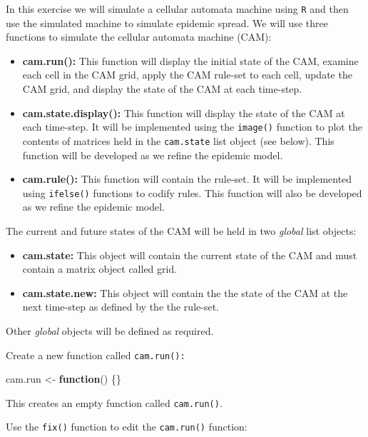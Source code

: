 \documentclass[12pt,a4paper]{book}
\newenvironment{Shaded}{\begin{snugshade}}{\end{snugshade}}
\newcommand{\ControlFlowTok}[1]{\textcolor[rgb]{0.13,0.29,0.53}{\textbf{#1}}}
\newcommand{\NormalTok}[1]{#1}
\newcommand{\StringTok}[1]{\textcolor[rgb]{0.31,0.60,0.02}{#1}}
\theoremstyle{definition}
\theoremstyle{definition}
\theoremstyle{definition}
\theoremstyle{remark}
\begin{document}
In this exercise we will simulate a cellular automata machine using
\texttt{R} and then use the simulated machine to simulate epidemic
spread. We will use three functions to simulate the cellular automata
machine (CAM):

\begin{itemize}
\item
  \textbf{cam.run():} This function will display the initial state of
  the CAM, examine each cell in the CAM grid, apply the CAM rule-set to
  each cell, update the CAM grid, and display the state of the CAM at
  each time-step.
\item
  \textbf{cam.state.display():} This function will display the state of
  the CAM at each time-step. It will be implemented using the
  \texttt{image()} function to plot the contents of matrices held in the
  \texttt{cam.state} list object (see below). This function will be
  developed as we refine the epidemic model.
\item
  \textbf{cam.rule():} This function will contain the rule-set. It will
  be implemented using \texttt{ifelse()} functions to codify rules. This
  function will also be developed as we refine the epidemic model.
\end{itemize}

The current and future states of the CAM will be held in two
\emph{global} list objects:

\begin{itemize}
\item
  \textbf{cam.state:} This object will contain the current state of the
  CAM and must contain a matrix object called grid.
\item
  \textbf{cam.state.new:} This object will contain the the state of the
  CAM at the next time-step as defined by the the rule-set.
\end{itemize}

Other \emph{global} objects will be defined as required.

Create a new function called \texttt{cam.run():}

\begin{Shaded}
\begin{Highlighting}[]
\NormalTok{cam.run <-}\StringTok{ }\ControlFlowTok{function}\NormalTok{() \{\}}
\end{Highlighting}
\end{Shaded}

This creates an empty function called \texttt{cam.run()}.

Use the \texttt{fix()} function to edit the \texttt{cam.run()} function:
\end{document}
